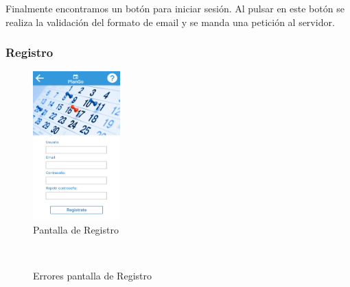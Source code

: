 \documentclass[a4paper, 12pt]{book}
\begin{document}
Finalmente encontramos un bot\'on para iniciar sesi\'on. Al pulsar en este bot\'on se realiza la
validaci\'on del formato de email y se manda una petici\'on al servidor.


\subsubsection{Registro}
\label{sec:registro}

\begin{figure}[H]
  \centering
  \includegraphics[width=0.3\textwidth]{img/register.png}
  \caption{Pantalla de Registro}
  \label{figura:register}
\end{figure}

\begin{figure}[H]
 \centering
  \\
 \caption{Errores pantalla de Registro}
 \label{f:animales}
\end{figure}
\end{document}
